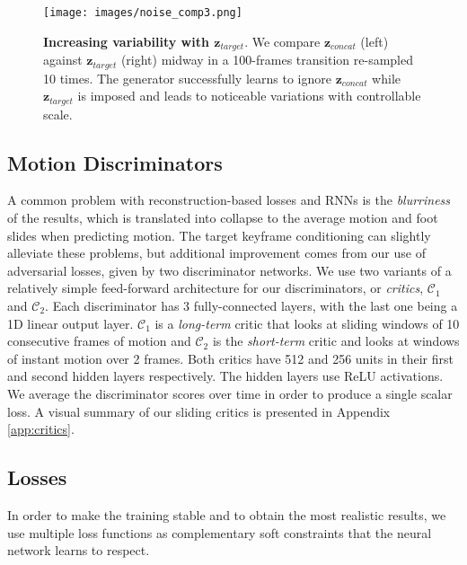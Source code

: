 \documentclass[acmtog]{acmart}
\newcommand{\bz}{\textbf{z}}
\begin{document}
\begin{figure}[h]
\begin{center}
\centerline{\texttt{[image: images/noise\_comp3.png]}}
  \caption{\textbf{Increasing variability with $\bz_{\mathit{target}}$}. We compare $\bz_{\mathit{concat}}$ (left) against $\bz_{\mathit{target}}$ (right) midway in a 100-frames transition re-sampled 10 times. The generator successfully learns to ignore $\bz_{\mathit{concat}}$ while $\bz_{\mathit{target}}$ is imposed and leads to noticeable variations with controllable scale.}
  \label{fig:noisecomp}
\end{center}
\vspace{-0.5cm}
\end{figure}
\subsection{Motion Discriminators}
A common problem with reconstruction-based losses and RNNs is the \textit{blurriness} of the results, which is translated into collapse to the average motion and foot slides when predicting motion. The target keyframe conditioning can slightly alleviate these problems, but additional improvement comes from our use of adversarial losses, given by two discriminator networks. We use two variants of a relatively simple feed-forward architecture for our discriminators, or \textit{critics}, $\mathcal{C}_1$ and $\mathcal{C}_2$. Each discriminator has 3 fully-connected layers, with the last one being a 1D linear output layer. $\mathcal{C}_1$ is a \textit{long-term} critic that looks at sliding windows of 10 consecutive frames of motion and $\mathcal{C}_2$ is the \textit{short-term} critic and looks at windows of instant motion over 2 frames. Both critics have 512 and 256 units in their first and second hidden layers respectively. The hidden layers use ReLU activations. We average the discriminator scores over time in order to produce a single scalar loss. A visual summary of our sliding critics is presented in Appendix \ref{app:critics}.
\subsection{Losses}\label{sec:losses}
In order to make the training stable and to obtain the most realistic results, we use multiple loss functions as complementary soft constraints that the neural network learns to respect.
\end{document}
